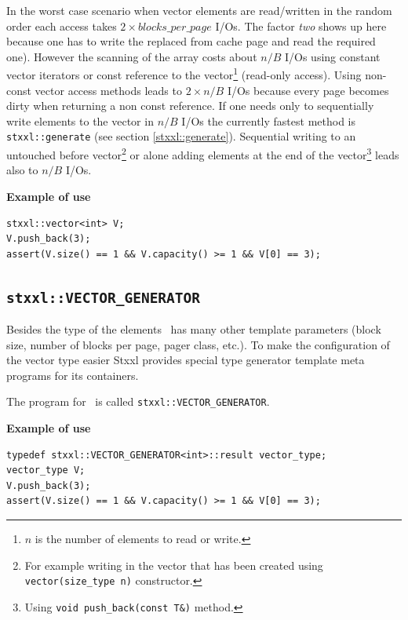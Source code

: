 \documentclass[twoside]{book}
\newcommand{\stxxl}{{\sc Stxxl} }
\begin{document}
In the worst case scenario when vector elements are
read/written in the random order each access takes $2 \times
blocks\_per\_page$ I/Os. The factor \emph{two} shows up here because one has
to write the replaced from cache page and read the required
one). However the scanning of the array costs about $n/B$ I/Os using
constant vector iterators or const reference to the
vector\footnote{$n$ is the number of elements to read or write.}
(read-only 
access). Using non-const vector access methods leads to $2 \times n/B$
I/Os because every page becomes dirty when returning a non const
reference. 
If one needs only to sequentially write elements to the vector in
$n/B$ I/Os the 
currently fastest method is \texttt{stxxl::generate} (see section
\ref{stxxl::generate}). Sequential writing to an untouched before 
vector\footnote{For example writing in the vector that has been
created using 
\texttt{vector(size\_type n)} constructor.} or alone 
adding elements at the end of the vector\footnote{Using \texttt{void
push\_back(const T\&)} method.} leads also to $n/B$ I/Os.  

{\bf Example of use}
\begin{lstlisting}
stxxl::vector<int> V;
V.push_back(3);
assert(V.size() == 1 && V.capacity() >= 1 && V[0] == 3);
\end{lstlisting}

\newcommand{\xvectorg}{\texttt{stxxl::VECTOR\_GENERATOR}}

\subsection{\xvectorg}


Besides the type of the elements \xvector\ has many other template parameters
(block size, number of blocks per page, pager class, etc.). To make
the configuration of the vector type easier \stxxl
provides special type generator template meta programs for its
containers.  

The program
for \xvector\ is called \xvectorg.

{\bf Example of use}
\begin{lstlisting}
typedef stxxl::VECTOR_GENERATOR<int>::result vector_type;
vector_type V;
V.push_back(3);
assert(V.size() == 1 && V.capacity() >= 1 && V[0] == 3);
\end{lstlisting}
\end{document}
